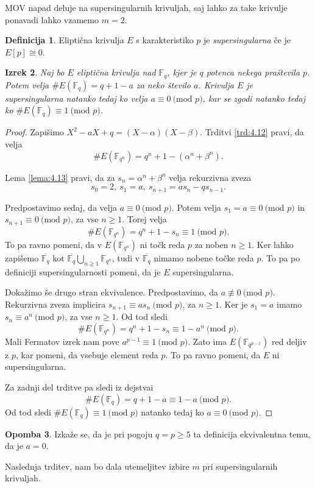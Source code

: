 \documentclass[12pt,a4paper,twoside]{article}
\theoremstyle{definition} %
\newtheorem{definicija}{Definicija}[section]
\newtheorem{opomba}[definicija]{Opomba}
\theoremstyle{plain} %
\newtheorem{izrek}[definicija]{Izrek}
\numberwithin{equation}{section}  %
\newcommand{\F}{\mathbb F}
\newcommand{\Fq}[1]{{\mathbb{F}_{#1}}}
\newcommand{\E}[1]{E({#1})}
\newcommand{\MOD}[1]{\ \text{(mod }{#1}\text{)}}
\begin{document}
MOV napad deluje na supersingularnih krivuljah, saj lahko za take krivulje ponavadi lahko vzamemo $m=2$.

\begin{definicija}
Eliptična krivulja $E$ s karakteristiko $p$ je \emph{supersingularna} če je $E[p] \cong 0$.
\end{definicija}


\begin{izrek}
Naj bo $E$ eliptična krivulja nad $\F_q$, kjer je $q$ potenca nekega praštevila $p$. Potem velja $\#\E{\F_q} = q+1-a$ za neko število $a$. Krivulja $E$ je supersingularna natanko tedaj ko  velja $a \equiv 0 \MOD{p}$, kar se zgodi natanko tedaj ko $\# \E{\Fq{q}} \equiv 1 \MOD{p}$.
\end{izrek}

\begin{proof}
Zapišimo $X^2-aX+q = (X-\alpha)(X-\beta)$. Trditvi \ref{trd:4.12} pravi, da velja
$$\# \E{\Fq{q^n}}  = q^n+1-(\alpha^n+\beta^n). $$

Lema \ref{lema:4.13} pravi, da za $s_n = \alpha^n + \beta^n$ velja rekurzivna zveza
$$s_0 = 2, \ s_1=a,\ s_{n+1} = as_n-qs_{n-1}.$$

Predpostavimo sedaj, da velja $a\equiv 0 \MOD{p}$. Potem velja $s_1 = a\equiv 0 \MOD{p}$ in $s_{n+1} \equiv 0 \MOD{p}$, za vse $n\geq 1$.
Torej velja
$$\# \E{\Fq{q^n}}  = q^n+1-s_n \equiv 1 \MOD{p}.$$
To pa ravno pomeni, da v $\E{\Fq{q^n}} $ ni točk reda $p$ za noben $n\geq 1$. Ker lahko zapišemo $\overline{\Fq{q}}$ kot $\overline{\Fq{q}} \bigcup_{n \geq 1} \Fq{q^n}$, tudi v $\overline{\Fq{q}}$ nimamo nobene točke reda $p$. To pa po definiciji supersingularnosti pomeni, da je $E$ supersingularna.

Dokažimo še drugo stran ekvivalence.
Predpostavimo, da $a \not \equiv 0 \MOD{p}$. Rekurzivna zveza implicira $s_{n+1} \equiv as_n \MOD{p}$, za $n \geq 1$. Ker je $s_1 = a$ imamo $s_n \equiv a^n \MOD{p}$, za vse $n \geq 1$.
Od tod sledi
$$\# \E{\Fq{q^n}}  = q^n+1-s_n \equiv 1-a^n \MOD{p}.$$
Mali Fermatov izrek nam pove $a^{p-1} \equiv 1 \MOD{p}$. Zato ima $E(\Fq{q^{p-1}})$ red deljiv z $p$, kar pomeni, da vsebuje element reda $p$. To pa ravno pomeni, da $E$ ni supersingularna.

Za zadnji del trditve pa sledi iz dejstvai
$$\# \E{\Fq{q}}  = q+1-a \equiv 1-a \MOD{p}.$$
Od tod sledi $\# \E{\Fq{q}} \equiv 1 \MOD{p}$ natanko tedaj ko $a\equiv 0 \MOD{p}$.
\end{proof}

\begin{opomba}
Izkaže se, da je pri pogoju $q=p \geq 5$ ta definicija ekvivalentna temu, da je $a=0$.
\end{opomba}
Naslednja trditev, nam bo dala utemeljitev izbire $m$ pri supersingularnih krivuljah.
\end{document}
